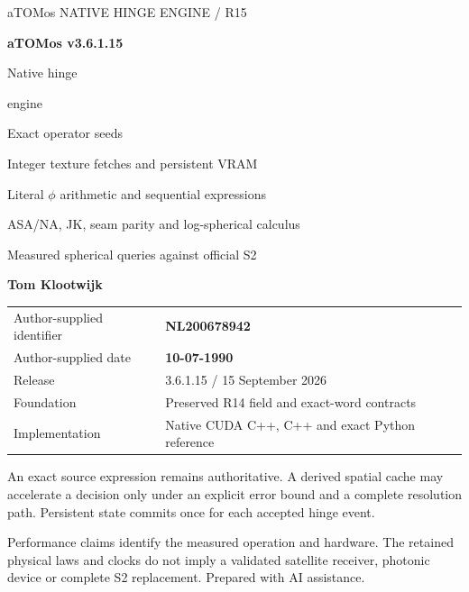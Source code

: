 

\begin{titlepage}\thispagestyle{empty}
{\sffamily\color{accent}\large aTOMos \hfill NATIVE HINGE ENGINE / R15}\par
\vspace{19mm}
{\sffamily\bfseries\fontsize{40}{48}\selectfont\color{ink}aTOMos v3.6.1.15}\par
\vspace{10mm}
{\sffamily\fontsize{34}{41}\selectfont Native hinge\par engine}\par
\vspace{10mm}
{\sffamily\fontsize{19}{25}\selectfont\color{gold}Exact operator seeds\par Integer texture fetches and persistent VRAM}\par
\vspace{12mm}
{\large Literal $\phi$ arithmetic and sequential expressions\par
ASA/NA, JK, seam parity and log-spherical calculus\par
Measured spherical queries against official S2}\par
\vspace{15mm}
{\sffamily\bfseries\Large Tom Klootwijk}\par
\begin{tabular}{@{}ll@{}}
Author-supplied identifier & \textbf{NL200678942}\\
Author-supplied date & \textbf{10-07-1990}\\
Release & 3.6.1.15 / 15 September 2026\\
Foundation & Preserved R14 field and exact-word contracts\\
Implementation & Native CUDA C++, C++ and exact Python reference\\
\end{tabular}
\vfill
\begin{panel}
An exact source expression remains authoritative. A derived spatial cache
may accelerate a decision only under an explicit error bound and a complete
resolution path. Persistent state commits once for each accepted hinge event.
\end{panel}
{\small\color{muted}Performance claims identify the measured operation and
hardware. The retained physical laws and clocks do not imply a validated
satellite receiver, photonic device or complete S2 replacement. Prepared with AI assistance.}
\end{titlepage}
\setcounter{page}{2}

\tableofcontents\clearpage

















\appendix


